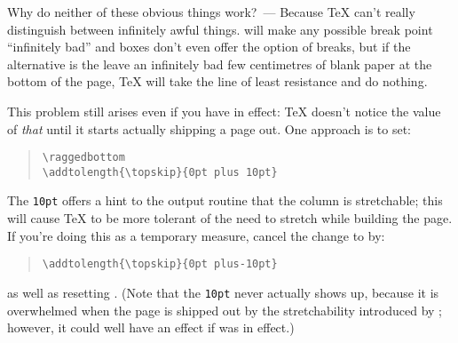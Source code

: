 Why do neither of these obvious things work?~--- Because \TeX{} can't
really distinguish between infinitely awful things.
 will make any possible break point ``infinitely
bad'' and boxes don't even offer the option of breaks, but if the
alternative is the leave an infinitely bad few centimetres of blank
paper at the bottom of the page, \TeX{} will take the line of least
resistance and do nothing.

This problem still arises even if you have  in
effect: \TeX{} doesn't notice the value of \emph{that} until it starts
actually shipping a page out.  One approach is to set:
\begin{quote}
\begin{verbatim}
\raggedbottom
\addtolength{\topskip}{0pt plus 10pt}
\end{verbatim}
\end{quote}
The \texttt{10pt} offers a hint to the output routine that the column is
stretchable; this will cause \TeX{} to be more tolerant of the need to
stretch while building the page.  If you're doing this as a temporary
measure, cancel the change to  by:
\begin{quote}
\begin{verbatim}
\addtolength{\topskip}{0pt plus-10pt}
\end{verbatim}
\end{quote}
as well as resetting .  (Note that the \texttt{10pt} never
actually shows up, because it is overwhelmed when the page is shipped
out by the stretchability introduced by ; however, it
could well have an effect if  was in effect.)

